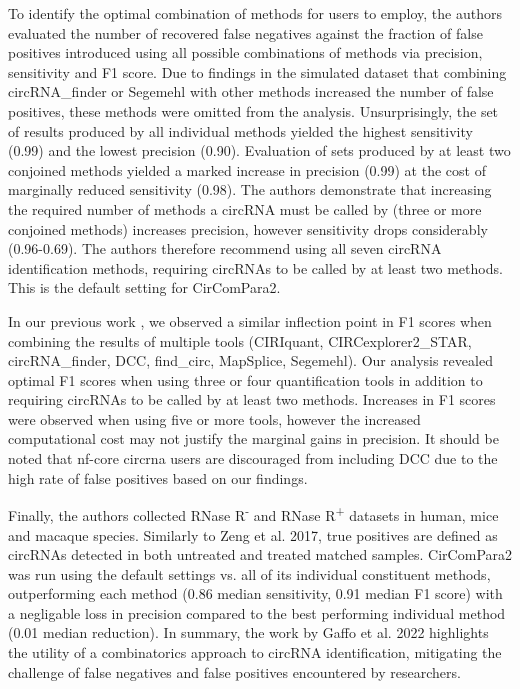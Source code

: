 To identify the optimal combination of methods for users to employ, the authors evaluated the number of recovered false negatives against the fraction of false positives introduced using all possible combinations of methods via precision, sensitivity and F1 score. Due to findings in the simulated dataset that combining circRNA\_finder or Segemehl with other methods increased the number of false positives, these methods were omitted from the analysis. Unsurprisingly, the set of results produced by all individual methods yielded the highest sensitivity (0.99) and the lowest precision (0.90). Evaluation of sets produced by at least two conjoined methods yielded a marked increase in precision (0.99) at the cost of marginally reduced sensitivity (0.98). The authors demonstrate that increasing the required number of methods a circRNA must be called by (three or more conjoined methods) increases precision, however sensitivity drops considerably (0.96-0.69). The authors therefore recommend using all seven circRNA identification methods, requiring circRNAs to be called by at least two methods. This is the default setting for CirComPara2. \par

In our previous work \cite{Digby2023Dec}, we observed a similar inflection point in F1 scores when combining the results of multiple tools (CIRIquant, CIRCexplorer2\_STAR, circRNA\_finder, DCC, find\_circ, MapSplice, Segemehl). Our analysis revealed optimal F1 scores when using three or four quantification tools in addition to requiring circRNAs to be called by at least two methods. Increases in F1 scores were observed when using five or more tools, however the increased computational cost may not justify the marginal gains in precision. It should be noted that nf-core circrna users are discouraged from including DCC due to the high rate of false positives based on our findings. \par

Finally, the authors collected RNase R\textsuperscript{-} and RNase R\textsuperscript{+} datasets in human, mice and macaque species. Similarly to Zeng et al. 2017, true positives are defined as circRNAs detected in both untreated and treated matched samples. CirComPara2 was run using the default settings vs. all of its individual constituent methods, outperforming each method (0.86 median sensitivity, 0.91 median F1 score) with a negligable loss in precision compared to the best performing individual method (0.01 median reduction). In summary, the work by Gaffo et al. 2022 highlights the utility of a combinatorics approach to circRNA identification, mitigating the challenge of false negatives and false positives encountered by researchers.

